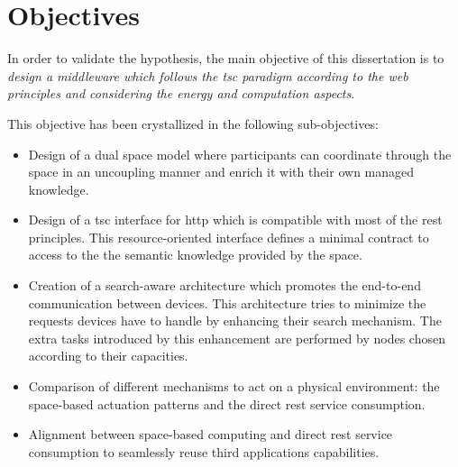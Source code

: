\section{Objectives}

In order to validate the hypothesis, the main objective of this dissertation is to
\emph{design a middleware which follows the \ac{tsc} paradigm according to the web principles and considering the energy and computation aspects}.

This objective has been crystallized in the following sub-objectives:

\begin{itemize} %
  \item Design of a dual space model where participants can coordinate through the space in an uncoupling manner and enrich it with their own managed knowledge.
  \item Design of a \ac{tsc} interface for \ac{http} which is compatible with most of the \ac{rest} principles.
	This resource-oriented interface defines a minimal contract to access to the the semantic knowledge provided by the space. %
  \item Creation of a search-aware architecture which promotes the end-to-end communication between devices. %
	This architecture tries to minimize the requests devices have to handle by enhancing their search mechanism.
	The extra tasks introduced by this enhancement are performed by nodes chosen according to their capacities.
  \item Comparison of different mechanisms to act on a physical environment: the space-based actuation patterns and the direct \ac{rest} service consumption.
  \item Alignment between space-based computing and direct \ac{rest} service consumption to seamlessly reuse third applications capabilities.
\end{itemize}